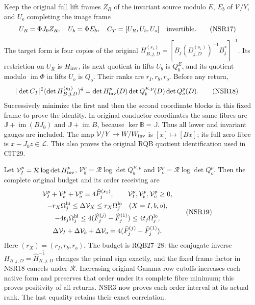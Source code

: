 \documentclass[11pt,a4paper]{article}
\begin{document}
Keep the original full lift frames $Z_R$ of the invariant
source modulo $E$, $E_b$ of $\mathcal V/Y$, and $U_o$
completing the image frame
\[
 U_R=\Phi J_0Z_R,\quad U_b=\Phi E_b,\quad
 C_T=[U_R,U_b,U_o]\quad\hbox{invertible}.
 \tag{NSR17}
\]
The target form is four copies of the original
$H_{B,j,D}^{(s_1)}
=[B_j(D_{j,D}^{(s_1)})^{-1}B_j^*]^{-1}$.
Its restriction on $U_R$ is $H_{\rm inv}$, its next
quotient in lifts $U_b$ is $Q_b^E$, and its quotient
modulo $\operatorname{im}\Phi$ in lifts $U_o$ is $Q_o$.
Their ranks are $r_I,r_b,r_o$. Before any return,
\[
 |\det C_T|^2(\det H_{B,j,D}^{(s_1)})^4
       =\det H_{\rm inv}^p(D)\det Q_b^{E,p}(D)\det Q_o^p(D).
 \tag{NSR18}
\]
Successively minimize the first and then the second
coordinate blocks in this fixed frame to prove the identity.
In original conductor coordinates the same fibres are
$\mathbb J+\operatorname{im}(BJ_0)$ and
$\mathbb J+\operatorname{im}B$, because
$\ker\mathbb B=\mathbb J$. Thus all lower and invariant
gauges are included. The map $\mathcal V/Y\to W/W_{\rm inv}$
is $[x]\mapsto[Bx]$; its full zero fibre is
$x-J_0z\in\mathscr L$. This also proves the original
RQB quotient identification used in CIT29.

Let
$\mathcal V_I^p=\mathcal R\log\det H_{\rm inv}^p$,
$\mathcal V_b^p=\mathcal R\log\det Q_b^{E,p}$ and
$\mathcal V_o^p=\mathcal R\log\det Q_o^p$.
Then the complete original budget and its order receiving are
\[
 \begin{gathered}
 \mathcal V_I^p+\mathcal V_b^p+\mathcal V_o^p
                      =4\widehat F_j^{(s_1)},\qquad
 \mathcal V_I^p,\mathcal V_b^p,\mathcal V_o^p\ge0,\\
 -r_X\Omega_j^{\rm hi}\le\Delta\mathcal V_X
                    \le r_X\Omega_j^{\rm lo}\quad(X=I,b,o),\\
 -4t_j\Omega_j^{\rm hi}\le
 4(\widehat F_j^{(j)}-\widehat F_j^{(1)})
                    \le4t_j\Omega_j^{\rm lo},\\
 \Delta\mathcal V_I+\Delta\mathcal V_b+\Delta\mathcal V_o
                =4(\widehat F_j^{(j)}-\widehat F_j^{(1)}).
 \end{gathered}\tag{NSR19}
\]
Here $(r_X)=(r_I,r_b,r_o)$. The budget is RQB27--28:
the conjugate inverse
$H_{B,j,D}=\overline{\widehat H_{K,j,D}^{-1}}$
changes the primal sign exactly, and the fixed frame
factor in NSR18 cancels under $\mathcal R$.
Increasing original Gamma row cutoffs increases each
native form and preserves that order under its complete
fibre minimum; this proves positivity of all returns.
NSR3 now proves each order interval at its actual rank.
The last equality retains their exact correlation.
\end{document}
